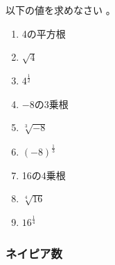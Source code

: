 \documentclass[twocolumn,11pt]{jarticle}
\begin{document}
\exercise
以下の値を求めなさい
。
\begin{enumerate}
\item\label{item:sqrt4} 4の平方根
\item\label{item:sqrt{4}} $\displaystyle\sqrt{4}$
\item\label{item:4^1/2} $\displaystyle 4^{\frac{1}{2}}$
\item\label{item:3rt-9} $-8$の$3$乗根
\item\label{item:sqrt3{-8}} $\displaystyle\sqrt[3]{-8}$
\item\label{item:(-8)^1/3} $\displaystyle (-8)^{\frac{1}{3}}$
\item\label{item:4rt16} 16の$4$乗根
\item\label{item:sqrt4{16}} $\displaystyle\sqrt[4]{16}$
\item\label{item:16^1/4} $\displaystyle 16^{\frac{1}{4}}$
\end{enumerate}

\subsubsection{ネイピア数}


\end{document}
